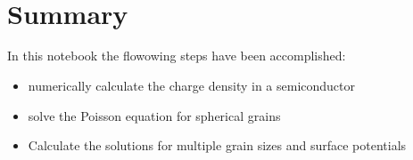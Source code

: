 \documentclass[11pt]{article}
\providecommand{\tightlist}{%
      \setlength{\itemsep}{0pt}\setlength{\parskip}{0pt}}
\begin{document}
    \begin{Verbatim}[commandchars=\\\{\}]





    \end{Verbatim}

    \begin{center}
    \end{center}
    { \hspace*{\fill} \\}
    
    \begin{Verbatim}[commandchars=\\\{\}]





    \end{Verbatim}

    \begin{center}
    \end{center}
    { \hspace*{\fill} \\}
    
    \begin{Verbatim}[commandchars=\\\{\}]





    \end{Verbatim}

    \hypertarget{summary}{%
\section{Summary}\label{summary}}

In this notebook the flowowing steps have been accomplished:

\begin{itemize}
\tightlist
\item
  numerically calculate the charge density in a semiconductor
\item
  solve the Poisson equation for spherical grains
\item
  Calculate the solutions for multiple grain sizes and surface
  potentials
\end{itemize}
\end{document}
